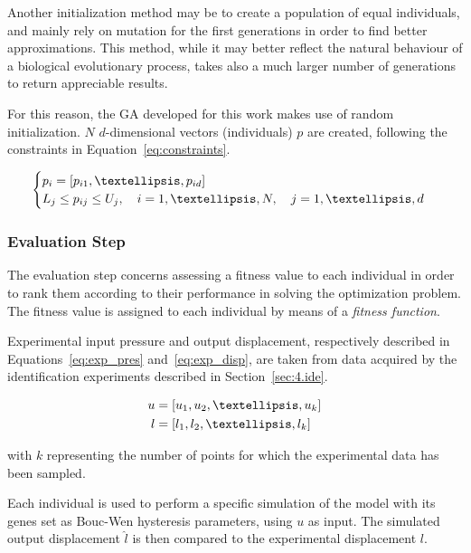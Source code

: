Another initialization method may be to create a population of equal
individuals, and mainly rely on mutation for the first generations
in order to find better approximations. This method, while it may better
reflect the natural behaviour of a biological evolutionary process,
takes also a much larger number of generations to return appreciable results.

For this reason, the GA developed for this work makes use of random initialization.
$N$ $d$-dimensional vectors (individuals) $p$ are created,
following the constraints in Equation~\ref{eq:constraints}.

\begin{align}
\begin{cases}
	p_i = \left[p_{i1},\textellipsis,p_{id}\right] \\
	L_j \leq p_{ij} \leq U_j, \quad i=1,\textellipsis,N, \quad j=1,\textellipsis,d
\end{cases}
\label{eq:constraints}
\end{align}


\subsubsection{Evaluation Step}

The evaluation step concerns assessing a fitness value to each individual
in order to rank them according to their performance in solving the optimization problem.
The fitness value is assigned to each individual by means of a \textit{fitness function}.

Experimental input pressure and output displacement,
respectively described in Equations~\ref{eq:exp_pres} and~\ref{eq:exp_disp},
are taken from data acquired by the identification experiments described
in Section~\ref{sec:4.ide}. 

\begin{align}
u &= \left[u_1,u_2,\textellipsis,u_k\right] \label{eq:exp_pres} \\
l &= \left[l_1,l_2,\textellipsis,l_k\right] \label{eq:exp_disp}
\end{align}

with $k$ representing the number of points for which the experimental data
has been sampled.

Each individual is used to perform a specific simulation of the model with its genes
set as Bouc-Wen hysteresis parameters, using $u$ as input.
The simulated output displacement $\hat{l}$
is then compared to the experimental displacement $l$.

